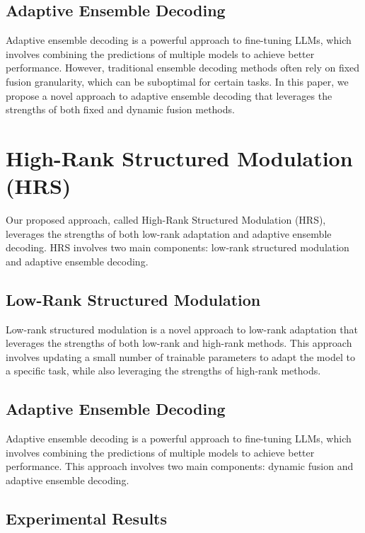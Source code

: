 \documentclass{article}
\begin{document}
\subsection{Adaptive Ensemble Decoding}

Adaptive ensemble decoding is a powerful approach to fine-tuning LLMs, which involves combining the predictions of multiple models to achieve better performance. However, traditional ensemble decoding methods often rely on fixed fusion granularity, which can be suboptimal for certain tasks. In this paper, we propose a novel approach to adaptive ensemble decoding that leverages the strengths of both fixed and dynamic fusion methods.

\section{High-Rank Structured Modulation (HRS)}

Our proposed approach, called High-Rank Structured Modulation (HRS), leverages the strengths of both low-rank adaptation and adaptive ensemble decoding. HRS involves two main components: low-rank structured modulation and adaptive ensemble decoding.

\subsection{Low-Rank Structured Modulation}

Low-rank structured modulation is a novel approach to low-rank adaptation that leverages the strengths of both low-rank and high-rank methods. This approach involves updating a small number of trainable parameters to adapt the model to a specific task, while also leveraging the strengths of high-rank methods.

\subsection{Adaptive Ensemble Decoding}

Adaptive ensemble decoding is a powerful approach to fine-tuning LLMs, which involves combining the predictions of multiple models to achieve better performance. This approach involves two main components: dynamic fusion and adaptive ensemble decoding.

\subsection{Experimental Results}
\end{document}
